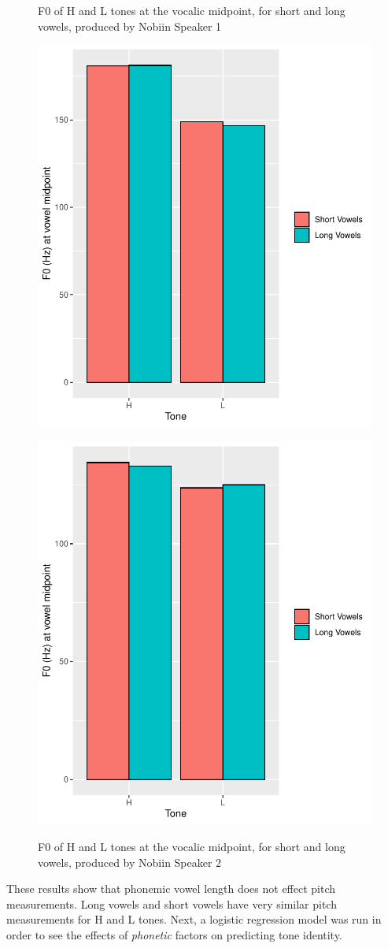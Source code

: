 \documentclass[output=paper]{langscibook}
\begin{document}
\begin{figure}
 \begin{floatrow}
  \captionsetup{margin=.05\linewidth}
   \ffigbox
     {\caption{F0 of H and L tones at the vocalic midpoint, for short and long vowels, produced by Nobiin Speaker 1\label{fig:oakley:TanutLengthToneInteraction}}}
     {\includegraphics[width=.5\textwidth]{figures/TanutPitchlength.pdf}}%
   \ffigbox
     {\caption{F0 of H and L tones at the vocalic midpoint, for short and long vowels, produced by Nobiin Speaker 2\label{fig:oakley:NubanLengthToneInteraction}}}
     {\includegraphics[width=.5\textwidth]{figures/NubanToneLengthFact.pdf}}
 \end{floatrow}
\end{figure}

These results show that phonemic vowel length does not effect pitch measurements. Long vowels and short vowels have very similar pitch measurements for H and L tones. Next, a logistic regression model was run in order to see the effects of \textit{phonetic} factors on predicting tone identity.
\end{document}
